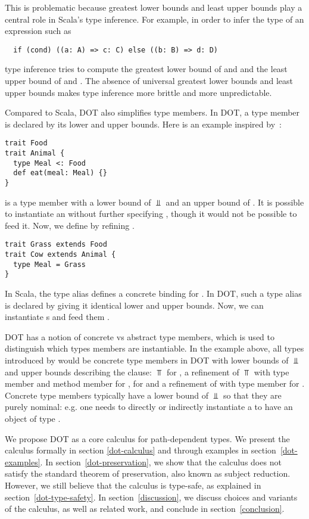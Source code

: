 \documentclass[9pt]{sigplanconf}
\begin{document}
This is problematic because greatest lower bounds and least upper bounds play a central role in
Scala's type inference. For example, in order to infer the type of an
 expression such as
\begin{lstlisting}
  if (cond) ((a: A) => c: C) else ((b: B) => d: D)
\end{lstlisting}
type inference tries to compute the greatest lower bound of  and  and
the least upper bound of  and . The absence of universal greatest lower bounds and
least upper bounds makes type inference more brittle and more unpredictable.

Compared to Scala, DOT also simplifies type members. In DOT, a type
member is declared by its lower and upper bounds. Here is an example
inspired by~\cite{vt}:
\begin{lstlisting}
trait Food
trait Animal {
  type Meal <: Food
  def eat(meal: Meal) {}
}
\end{lstlisting}
 is a type member with a lower bound of $\Bot$ and an upper
bound of . It is possible to instantiate an 
without further specifying , though it would not be
possible to feed it. Now, we define  by refining
.
\begin{lstlisting}
trait Grass extends Food
trait Cow extends Animal {
  type Meal = Grass
}
\end{lstlisting}
In Scala, the type alias  defines a concrete
binding for . In DOT, such a type alias is declared by
giving it identical lower and upper bounds. Now, we can instantiate
s and feed them .

DOT has a notion of concrete vs abstract type members, which is used
to distinguish which types members are instantiable. In the example
above, all types introduced by  would be concrete type
members in DOT with lower bounds of $\Bot$ and upper bounds describing
the  clause: $\Top$ for , a refinement of
$\Top$ with type member  and method member  for
,  for  and a refinement of
 with type member  for . Concrete
type members typically have a lower bound of $\Bot$ so that they are
purely nominal: e.g. one needs to directly or indirectly instantiate a
 to have an object of type .

We propose DOT as a core calculus for path-dependent types. We present
the calculus formally in section \ref{dot-calculus} and through
examples in section~\ref{dot-examples}. In
section~\ref{dot-preservation}, we show that the calculus does not
satisfy the standard theorem of preservation, also known as subject
reduction. However, we still believe that the calculus is type-safe,
as explained in section~\ref{dot-type-safety}. In
section~\ref{discussion}, we discuss choices and variants of the
calculus, as well as related work, and conclude in
section~\ref{conclusion}.
\end{document}
